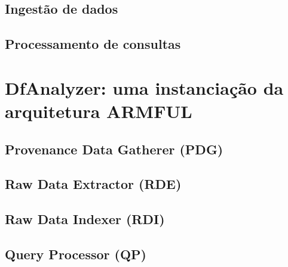 \subsection{Ingestão de dados}


\subsection{Processamento de consultas}



\section{DfAnalyzer: uma instanciação da arquitetura ARMFUL}


\subsection{Provenance Data Gatherer (PDG)}

\subsection{Raw Data Extractor (RDE)}

\subsection{Raw Data Indexer (RDI)}


\subsection{Query Processor (QP)}